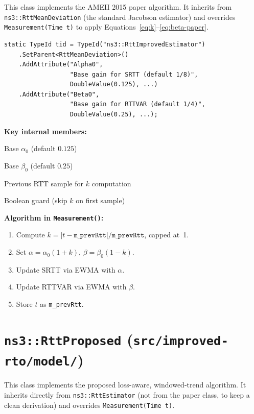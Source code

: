 \documentclass[12pt,a4paper]{report}
\begin{document}
This class implements the AMEII 2015 paper algorithm.  It inherits from
\texttt{ns3::RttMeanDeviation} (the standard Jacobson estimator) and overrides
\texttt{Measurement(Time t)} to apply Equations~\ref{eq:k}--\ref{eq:beta-paper}.

\begin{lstlisting}[style=cppstyle, caption={Key
    attributes of \texttt{RttImprovedEstimator}}]
static TypeId tid = TypeId("ns3::RttImprovedEstimator")
    .SetParent<RttMeanDeviation>()
    .AddAttribute("Alpha0",
                  "Base gain for SRTT (default 1/8)",
                  DoubleValue(0.125), ...)
    .AddAttribute("Beta0",
                  "Base gain for RTTVAR (default 1/4)",
                  DoubleValue(0.25), ...);
\end{lstlisting}

\textbf{Key internal members:}
\begin{description}[leftmargin=3cm, style=nextline]
  \item[\texttt{m\_alpha0}]  Base $\alpha_0$ (default $0.125$)
  \item[\texttt{m\_beta0}]   Base $\beta_0$ (default $0.25$)
  \item[\texttt{m\_prevRtt}] Previous RTT sample for $k$ computation
  \item[\texttt{m\_hasPrev}] Boolean guard (skip $k$ on first sample)
\end{description}

\textbf{Algorithm in \texttt{Measurement()}:}
\begin{enumerate}
  \item Compute $k = |t - \texttt{m\_prevRtt}| / \texttt{m\_prevRtt}$, capped at~1.
  \item Set $\alpha = \alpha_0(1+k)$, $\beta = \beta_0(1-k)$.
  \item Update SRTT via EWMA with $\alpha$.
  \item Update RTTVAR via EWMA with $\beta$.
  \item Store $t$ as \texttt{m\_prevRtt}.
\end{enumerate}

\section{\texttt{ns3::RttProposed}
         (\texttt{src/improved-rto/model/})}

This class implements the proposed loss-aware, windowed-trend algorithm.  It
inherits directly from \texttt{ns3::RttEstimator} (not from the paper class,
to keep a clean derivation) and overrides \texttt{Measurement(Time t)}.
\end{document}
